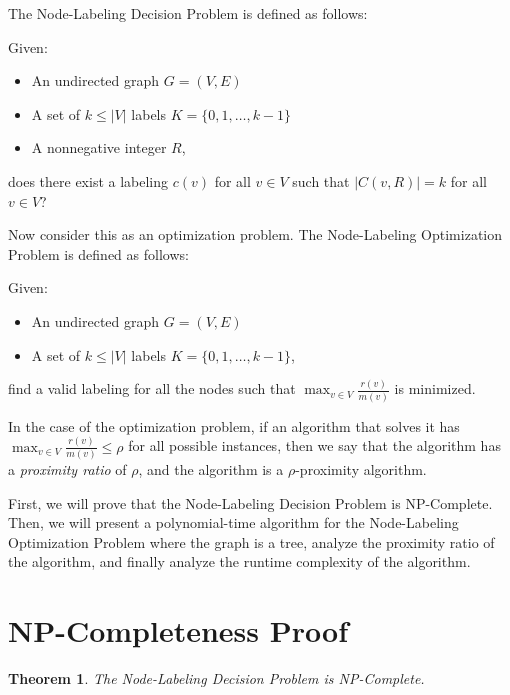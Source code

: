 \documentclass{article}
\newtheorem{theorem}{Theorem}
\begin{document}
\newpage\noindent
The Node-Labeling Decision Problem is defined as follows:

\vspace{1em}\noindent
Given:
\begin{itemize}
    \item An undirected graph $G = (V, E)$
    \item A set of $k \leq |V|$ labels $K = \{0, 1, \ldots, k-1\}$
    \item A nonnegative integer $R$,
\end{itemize}
does there exist a labeling $c(v)$ for all $v \in V$ such that $|C(v, R)| = k$ for all $v \in V$?

\vspace{1em}\noindent
Now consider this as an optimization problem.
The Node-Labeling Optimization Problem is defined as follows:

\vspace{1em}\noindent
Given:
\begin{itemize}
    \item An undirected graph $G = (V, E)$
    \item A set of $k \leq |V|$ labels $K = \{0, 1, \ldots, k-1\}$,
\end{itemize}
find a valid labeling for all the nodes such that $\max_{v \in V} \frac{r(v)}{m(v)}$ is minimized.

\vspace{1em}

In the case of the optimization problem, if an algorithm that solves it has $\max_{v \in V} \frac{r(v)}{m(v)} \leq \rho$ for all possible instances, 
then we say that the algorithm has a \textit{proximity ratio} of $\rho$, and the algorithm is a $\rho$-proximity algorithm.

\vspace{1em}

First, we will prove that the Node-Labeling Decision Problem is NP-Complete.
Then, we will present a polynomial-time algorithm for the Node-Labeling Optimization Problem where the graph is a tree,
analyze the proximity ratio of the algorithm, and finally analyze the runtime complexity of the algorithm.

\section{NP-Completeness Proof}

\begin{theorem}
    The Node-Labeling Decision Problem is NP-Complete.
\end{theorem}
\end{document}
